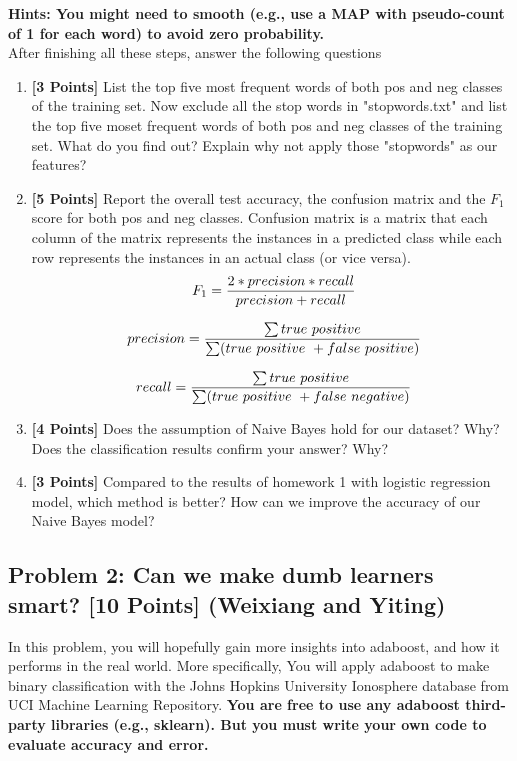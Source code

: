 \documentclass{article}
\begin{document}
 \textbf{Hints: You might need to smooth (e.g., use a MAP with pseudo-count of 1 for each word) to avoid zero probability. }
\\ After finishing all these steps, answer the following questions

\begin{enumerate}
	\item \textbf{[3 Points]} List the top five most frequent words of both pos and neg classes of the training set. Now exclude all the stop words in "stopwords.txt" and list the top five moset frequent words of both pos and neg classes of the training set. What do you find out? Explain why not apply those "stopwords" as our features?  
	
 	\item \textbf{[5 Points]} Report the overall test accuracy, the confusion matrix and the $F_1$ score for both pos and neg classes. Confusion matrix is a matrix that each column of the matrix represents the instances in a predicted class while each row represents the instances in an actual class (or vice versa).   
	\begin{equation}\label{eqn:f1score}
	\ F_1 =  {2*precision*recall\over precision + recall}
	\end{equation}
	
	\begin{equation}\label{eqn:precision}
	\ precision =  {\sum true\ positive\over \sum (true\ positive\ +  false\ positive)}
	\end{equation}
	
	\begin{equation}\label{eqn:recall}
	\ recall =  {\sum true\ positive\over \sum (true\ positive\ +  false\ negative)}
	\end{equation}
	
	\item \textbf{[4 Points]} Does the assumption of Naive Bayes hold for our dataset? Why? Does the classification results confirm your answer? Why?
	
	\item \textbf{[3 Points]} Compared to the results of homework 1 with logistic regression model, which method is better? How can we improve the accuracy of our Naive Bayes model?
	
\end{enumerate}

\subsection*{Problem 2: Can we make dumb learners smart?
 [10 Points] (Weixiang and Yiting)}
In this problem, you will hopefully gain more insights into adaboost, and how it performs in the real world. More specifically, You will apply adaboost to make binary classification with the Johns Hopkins University Ionosphere database from UCI Machine Learning Repository. \textbf{You are free to use any adaboost third-party libraries (e.g., sklearn). But you must write your own code to evaluate accuracy and error.} 
\end{document}
